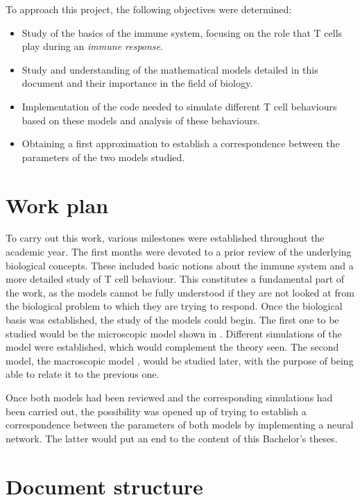To approach this project, the following objectives were determined:

\begin{itemize}
	
	\item Study of the basics of the immune system, focusing on the role that T cells play during an \textit{immune response}.
	
	\item Study and understanding of the mathematical models detailed in this document and their importance in the field of biology.
	
	\item Implementation of the code needed to simulate different T cell behaviours based on these models and analysis of these behaviours. 
	
	\item Obtaining a first approximation to establish a correspondence between the parameters of the two models studied. 
\end{itemize}

\section{Work plan}

To carry out this work, various milestones were established throughout the academic year. The first months were devoted to a prior review of the underlying biological concepts. These included basic notions about the immune system and a more detailed study of T cell behaviour. This constitutes a fundamental part of the work, as the models cannot be fully understood if they are not looked at from the biological problem to which they are trying to respond. Once the biological basis was established, the study of the models could begin. The first one to be studied would be the microscopic model shown in \cite{JTB}. Different simulations of the model were established, which would complement the theory seen. The second model, the macroscopic model \citep{arias2015growth}, would be studied later, with the purpose of being able to relate it to the previous one. 

Once both models had been reviewed and the corresponding simulations had been carried out, the possibility was opened up of trying to establish a correspondence between the parameters of both models by implementing a neural network. The latter would put an end to the content of this Bachelor's theses.


\section{Document structure}

